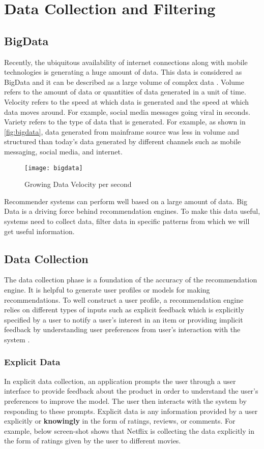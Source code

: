 
\section{Data Collection and Filtering}
\subsection{BigData}
Recently, the ubiquitous availability of internet connections along with mobile technologies is generating a huge amount of data. This data is considered as BigData and it can be described as a large volume of complex data \cite{2}. Volume refers to the amount of data or quantities of data generated in a unit of time. Velocity refers to the speed at which data is generated and the speed at which data moves around. For example, social media messages going viral in seconds. Variety refers to the type of data that is generated. For example, as shown in \autoref{fig:bigdata}, data generated from mainframe source was less in volume and structured than today's data generated by different channels such as mobile messaging, social media, and internet.
\\
\begin{figure}[H]
	\centering
	\texttt{[image: bigdata]}
	\caption{Growing Data Velocity per second}
	\label{fig:bigdata}
\end{figure}

\noindent Recommender systems can perform well based on a large amount of data. Big Data is a driving force behind recommendation engines.
To make this data useful, systems need to collect data, filter data in specific patterns from which we will get useful information. 

\subsection{Data Collection}

The data collection phase is a foundation of the accuracy of the recommendation engine. It is helpful to generate user profiles or models for making recommendations. To well construct a user profile, a recommendation engine relies on different types of inputs such as explicit feedback which is explicitly specified by a user to notify a user's interest in an item or providing implicit feedback by understanding user preferences from user's interaction with the system \cite{34}. 

\subsubsection{Explicit Data}
In explicit data collection, an application prompts the user through a user interface to provide feedback about the product in order to understand the user's preferences to improve the model. The user then interacts with the system by responding to these prompts. Explicit data is any information provided by a user explicitly or \textbf{knowingly} in the form of ratings, reviews, or comments. For example, below screen-shot shows that Netflix is collecting the data explicitly in the form of ratings given by the user to different movies. 
\\

